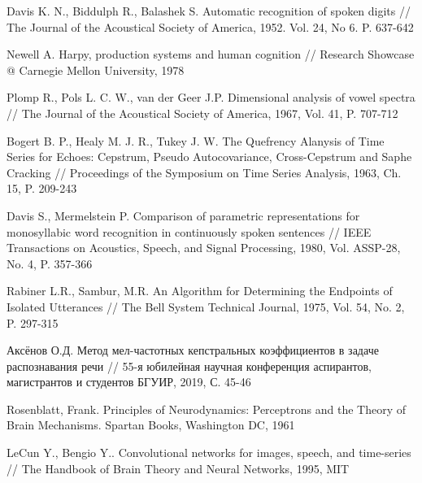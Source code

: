 \begin{thebibliography}{1}
Davis K. N., Biddulph R., Balashek S. Automatic recognition of spoken digits // The Journal of the Acoustical Society of America, 1952. Vol. 24, No 6. P. 637-642 

Newell A. Harpy, production systems and human cognition // Research Showcase @ Carnegie Mellon University, 1978

Plomp R., Pols L. C. W., van der Geer J.P. Dimensional analysis of vowel spectra // The Journal of the Acoustical Society of America, 1967, Vol. 41, P. 707-712 

Bogert B. P., Healy M. J. R., Tukey J. W. The Quefrency Alanysis of Time Series for Echoes: Cepstrum, Pseudo Autocovariance, Cross-Cepstrum and Saphe Cracking // Proceedings of the Symposium on Time Series Analysis, 1963, Ch. 15, P. 209-243

Davis S., Mermelstein P. Comparison of parametric representations for monosyllabic word recognition in continuously spoken sentences // IEEE Transactions on Acoustics, Speech, and Signal Processing, 1980, Vol. ASSP-28, No. 4, P. 357-366

Rabiner L.R., Sambur, M.R. An Algorithm for Determining the Endpoints of Isolated Utterances // The Bell System Technical Journal, 1975, Vol. 54, No. 2, P. 297-315

Аксёнов О.Д. Метод мел-частотных кепстральных коэффициентов в задаче распознавания речи // 55-я юбилейная научная конференция аспирантов, магистрантов и студентов БГУИР, 2019, С. 45-46

Rosenblatt, Frank. Principles of Neurodynamics: Perceptrons and the Theory of Brain Mechanisms. Spartan Books, Washington DC, 1961

LeCun Y., Bengio Y.. Convolutional networks for images, speech, and time-series // The Handbook of Brain Theory and Neural Networks, 1995, MIT 
\end{thebibliography}